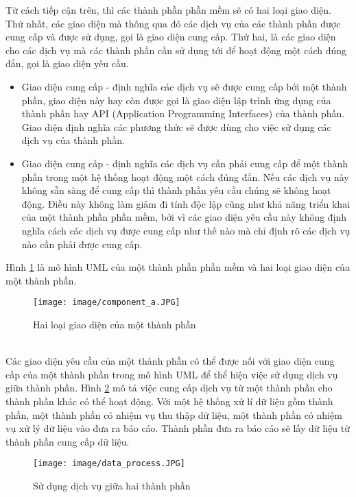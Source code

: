 Từ cách tiếp cận trên, thì các thành phần phần mềm sẽ có hai loại giao diện. Thứ nhất, các giao diện mà thông qua đó các dịch vụ của các thành phần được cung cấp và được sử dụng, gọi là giao diện cung cấp. Thứ hai, là các giao diện cho các dịch vụ mà các thành phần cần sử dụng tới để hoạt động một cách đúng đắn, gọi là giao diện yêu cầu.

\begin{itemize}
  \item Giao diện cung cấp - định nghĩa các dịch vụ sẽ được cung cấp bởi một thành phần, giao diện này hay còn được gọi là giao diện lập trình ứng dụng của thành phần hay API (Application Programming Interfaces) của thành phần. Giao diện định nghĩa các phương thức sẽ được dùng cho việc sử dụng các dịch vụ của thành phần.
  \item Giao diện cung cấp - định nghĩa các dịch vụ cần phải cung cấp để một thành phần trong một hệ thống hoạt động một cách đúng đắn. Nếu các dịch vụ này không sẵn sàng để cung cấp thì thành phần yêu cầu chúng sẽ không hoạt động. Điều này không làm giảm đi tính độc lập cũng như khả năng triển khai của một thành phần phần mềm, bởi vì các giao diện yêu cầu này không định nghĩa cách các dịch vụ được cung cấp như thế nào mà chỉ định rõ các dịch vụ nào cần phải được cung cấp.\\
\end{itemize}
Hình \ref{fig:component_a} là mô hình UML của một thành phần phần mềm và hai loại giao diện của một thành phần.
	\begin{figure}[htbp]
		\centering
			\texttt{[image: image/component\_a.JPG]}
		\caption{Hai loại giao diện của một thành phần}
		\label{fig:component_a}
	\end{figure}\\
	
Các giao diện yêu cầu của một thành phần có thể được nối với giao diện cung cấp của một thành phần trong mô hình UML để thể hiện việc sử dụng dịch vụ giữa thành phần. Hình \ref{fig:data_process} mô tả việc cung cấp dịch vụ từ một thành phần cho thành phần khác có thể hoạt động. Với một hệ thống xử lí dữ liệu gồm thành phần, một thành phần có nhiệm vụ thu thập dữ liệu, một thành phần có nhiệm vụ xử lý dữ liệu vào đưa ra báo cáo. Thành phần đưa ra báo cáo sẽ lấy dữ liệu từ thành phần cung cấp dữ liệu.\\

\begin{figure}[htbp]
	\centering
		\texttt{[image: image/data\_process.JPG]}
	\caption{Sử dụng dịch vụ giữa hai thành phần}
	\label{fig:data_process}
\end{figure}

